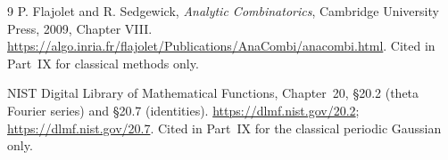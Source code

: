 \documentclass[11pt,a4paper]{article}
\theoremstyle{definition}\newaliascnt{definition}{theorem}
\theoremstyle{remark}\newaliascnt{remark}{theorem}
\begin{document}
\begin{thebibliography}{9}
P. Flajolet and R. Sedgewick, \emph{Analytic Combinatorics}, Cambridge
University Press, 2009, Chapter VIII.
\url{https://algo.inria.fr/flajolet/Publications/AnaCombi/anacombi.html}.
Cited in Part~IX for classical methods only.

NIST Digital Library of Mathematical Functions, Chapter~20, \S20.2 (theta
Fourier series) and \S20.7 (identities). \url{https://dlmf.nist.gov/20.2};
\url{https://dlmf.nist.gov/20.7}. Cited in Part~IX for the classical
periodic Gaussian only.
\end{thebibliography}
\end{document}

